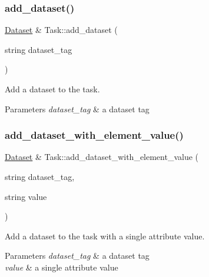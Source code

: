 \subsubsection{\texorpdfstring{add\+\_\+dataset()}{add\_dataset()}}
{\footnotesize\ttfamily \hyperlink{classDataset}{Dataset} \& Task\+::add\+\_\+dataset (\begin{DoxyParamCaption}\item[{string}]{dataset\+\_\+tag }\end{DoxyParamCaption})}

Add a dataset to the task. 
\begin{DoxyParams}{Parameters}
{\em dataset\+\_\+tag} & a dataset tag \\
\hline
\end{DoxyParams}
\mbox{\label{classTask_a052ec7c44c26ed666d327eb1b34451d8}} 
\subsubsection{\texorpdfstring{add\+\_\+dataset\+\_\+with\+\_\+element\+\_\+value()}{add\_dataset\_with\_element\_value()}}
{\footnotesize\ttfamily \hyperlink{classDataset}{Dataset} \& Task\+::add\+\_\+dataset\+\_\+with\+\_\+element\+\_\+value (\begin{DoxyParamCaption}\item[{string}]{dataset\+\_\+tag,  }\item[{string}]{value }\end{DoxyParamCaption})}

Add a dataset to the task with a single attribute value. 
\begin{DoxyParams}{Parameters}
{\em dataset\+\_\+tag} & a dataset tag \\
\hline
{\em value} & a single attribute value \\
\hline
\end{DoxyParams}
\mbox{\label{classTask_ad0eeaa007ee192d7866a101c93730ab7}} 
